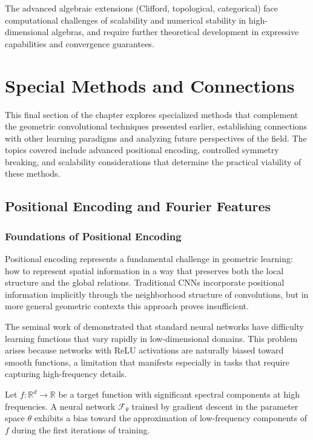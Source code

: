 The advanced algebraic extensions (Clifford, topological, categorical) face computational challenges of scalability and numerical stability in high-dimensional algebras, and require further theoretical development in expressive capabilities and convergence guarantees.

\section{Special Methods and Connections}\label{sec:special_methods}

This final section of the chapter explores specialized methods that complement the geometric convolutional techniques presented earlier, establishing connections with other learning paradigms and analyzing future perspectives of the field. The topics covered include advanced positional encoding, controlled symmetry breaking, and scalability considerations that determine the practical viability of these methods.

\subsection{Positional Encoding and Fourier Features}

\subsubsection{Foundations of Positional Encoding}

Positional encoding represents a fundamental challenge in geometric learning: how to represent spatial information in a way that preserves both the local structure and the global relations. Traditional CNNs incorporate positional information implicitly through the neighborhood structure of convolutions, but in more general geometric contexts this approach proves insufficient.

The seminal work of \citet{tancik2020fourier} demonstrated that standard neural networks have difficulty learning functions that vary rapidly in low-dimensional domains. This problem arises because networks with \gls{ReLU} activations are naturally biased toward smooth functions, a limitation that manifests especially in tasks that require capturing high-frequency details.

\begin{theorem}
Let $f: \mathbb{R}^d \to \mathbb{R}$ be a target function with significant spectral components at high frequencies. A neural network $\mathcal{F}_\theta$ trained by gradient descent in the parameter space $\theta$ exhibits a bias toward the approximation of low-frequency components of $f$ during the first iterations of training.
\end{theorem}

